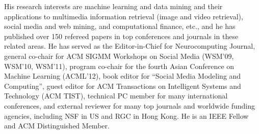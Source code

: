 {\begin{IEEEbiography}
    His research interests are machine learning and data mining and their applications to multimedia information retrieval (image and video retrieval), social media and web mining, and computational finance, etc., and he has published over 150 refereed papers in top conferences and journals in these related areas.
    He has served as the Editor-in-Chief for Neurocomputing Journal, general co-chair for ACM SIGMM Workshops on Social Media (WSM'09, WSM'10, WSM'11), program co-chair for the fourth Asian Conference on Machine Learning (ACML'12), book editor for ``Social Media Modeling and Computing'', guest editor for ACM Transactions on Intelligent Systems and Technology (ACM TIST), technical PC member for many international conferences, and external reviewer for many top journals and worldwide funding agencies, including NSF in US and RGC in Hong Kong. He is an IEEE Fellow and ACM Distinguished Member.
\vspace{-0.2in}
\end{IEEEbiography}
\clearpage
{}

}
